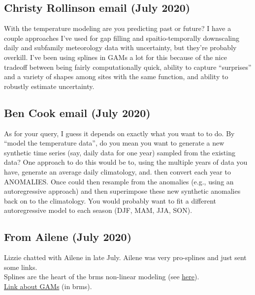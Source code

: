 \documentclass[11pt,letter]{article}
\begin{document}
\subsection{Christy Rollinson email (July 2020)}

With the temperature modeling are you predicting past or future?  I have a couple approaches I've used for gap filling and spaitio-temporally downscaling daily and subfamily meteorology data with uncertainty, but they're probably overkill.  I've been using splines in GAMs a lot for this because of the nice tradeoff between being fairly computationally quick, ability to capture ``surprises''  and a variety of shapes among sites with the same function, and ability to robustly estimate uncertainty.\\

\subsection{Ben Cook email (July 2020)}

As for your query, I guess it depends on exactly what you want to to do. By ``model the temperature data'', do you mean you want to generate a new synthetic time series (say, daily data for one year) sampled from the existing data? One approach to do this would be to, using the multiple years of data you have, generate an average daily climatology, and. then convert each year to ANOMALIES. Once could then resample from the anomalies (e.g., using an autoregressive approach) and then superimpose these new synthetic anomalies back on to the climatology. You would probably want to fit a different autoregressive model to each season (DJF, MAM, JJA, SON). \\

\subsection{From Ailene (July 2020)}
Lizzie chatted with Ailene in late July. Ailene was very pro-splines and just sent some links.\\

Splines are the heart of the brms non-linear modeling (see \href{https://mran.microsoft.com/snapshot/2017-05-14/web/packages/brms/vignettes/brms_multilevel.pdf}{here}).\\

\href{https://fromthebottomoftheheap.net/2018/04/21/fitting-gams-with-brms/}{Link about GAMs} (in brms).\\
\end{document}
